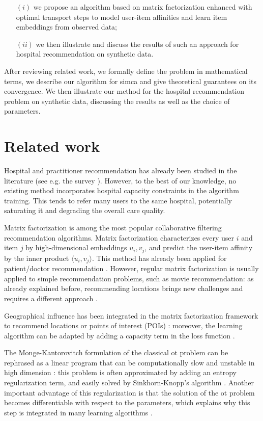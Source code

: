 \begin{itemize}
    \item[$(i)$] we propose an algorithm based on matrix factorization enhanced with optimal transport steps to model user-item affinities and learn item embeddings from observed data;
    \item[$(ii)$] we then illustrate and discuss the results of such an approach for hospital recommendation on synthetic data.
\end{itemize}

After reviewing related work, we formally define the problem in mathematical terms, we describe our algorithm for \ac{simca} and give theoretical guarantees on its convergence. We then illustrate our method for the hospital recommendation problem on synthetic data, discussing the results as well as the choice of parameters.

\section{Related work}
Hospital and practitioner recommendation has already been studied in the literature (see e.g. the survey \cite{tran_recommender_2021}). However, to the best of our knowledge, no existing method incorporates hospital capacity constraints in the algorithm training. This tends to refer many users to the same hospital, potentially saturating it and degrading the overall care quality.

Matrix factorization \cite{koren_matrix_2009} is among the most popular collaborative filtering recommendation algorithms. Matrix factorization characterizes every user $i$ and item $j$ by high-dimensional embeddings $u_i, v_j$, and predict the user-item affinity by the inner product $\langle u_i, v_j \rangle$. This method has already been applied for patient/doctor recommendation \cite{zhang_idoctor_2017, han_hybrid_2018}. However, regular matrix factorization is usually applied to simple recommendation problems, such as movie recommendation: as already explained before, recommending locations brings new challenges and requires a different approach \cite{zhao_survey_2016}.

Geographical influence has been integrated in the matrix factorization framework to recommend locations or points of interest (POIs) \cite{li_rank-geofm_2015}: moreover, the learning algorithm can be adapted by adding a capacity term in the loss function \cite{christakopoulou_recommendation_2017}.

The Monge-Kantorovitch formulation of the classical \ac{ot} problem can be rephrased as a linear program that can be computationally slow and unstable in high dimension \cite{cuturi_sinkhorn_2013}: this problem is often approximated by adding an entropy regularization term, and easily solved by Sinkhorn-Knopp's algorithm \cite{cuturi_sinkhorn_2013}. Another important advantage of this regularization is that the solution of the \ac{ot} problem becomes differentiable with respect to the parameters, which explains why this step is integrated in many learning algorithms \cite{genevay_learning_2017,cuturi_soft-dtw_2018,tai_sinkhorn_2021}.

